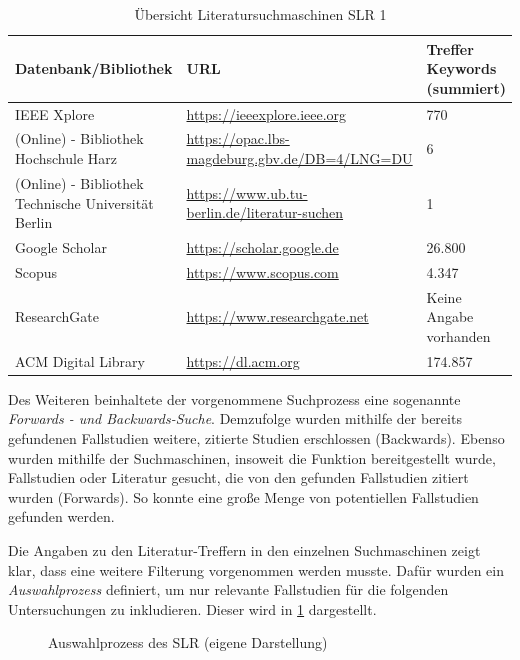 \begin{table}[ht]
	\centering
	\caption{Übersicht Literatursuchmaschinen SLR 1}
	\begin{tabular}{|p{5cm}|p{7cm}||p{3cm}|}
		\hline
		\textbf{Datenbank/Bibliothek}& \textbf{URL} &  \textbf{Treffer Keywords  (summiert)} \\
		\hline
		IEEE Xplore & \url{https://ieeexplore.ieee.org} & 770 \\
		(Online) - Bibliothek Hochschule Harz & \url{https://opac.lbs-magdeburg.gbv.de/DB=4/LNG=DU} & 6 \\
		(Online) - Bibliothek Technische Universität Berlin  & \url{https://www.ub.tu-berlin.de/literatur-suchen}& 1 \\
		Google Scholar &  \url{https://scholar.google.de}  & 26.800 \\
		Scopus & \url{https://www.scopus.com} & 4.347 \\
		ResearchGate & \url{https://www.researchgate.net} &Keine Angabe vorhanden \footnotemark \\ 
		ACM Digital Library & \url{https://dl.acm.org} & 174.857 \\
		\hline
	\end{tabular}
	\label{tab:suchmaschinenslr1}
\end{table}


Des Weiteren beinhaltete der vorgenommene Suchprozess eine sogenannte \textit{Forwards - und Backwards-Suche}. Demzufolge wurden mithilfe der bereits gefundenen Fallstudien weitere, zitierte Studien erschlossen (Backwards). Ebenso wurden mithilfe der Suchmaschinen, insoweit die Funktion bereitgestellt wurde, Fallstudien oder Literatur gesucht, die von den gefunden Fallstudien zitiert wurden (Forwards). So konnte eine große Menge von potentiellen Fallstudien  gefunden werden.

Die Angaben zu den Literatur-Treffern in den einzelnen Suchmaschinen zeigt klar, dass eine weitere Filterung vorgenommen werden musste. Dafür wurden ein \textit{Auswahlprozess} definiert, um nur relevante Fallstudien für die folgenden Untersuchungen zu inkludieren. Dieser wird in \ref{fig:auswahlprozess} dargestellt.

\begin{figure}[H]
	\centering
	\caption[Auswahlprozess des SLR]{Auswahlprozess des SLR (eigene Darstellung)}
	\label{fig:auswahlprozess}
\end{figure}


